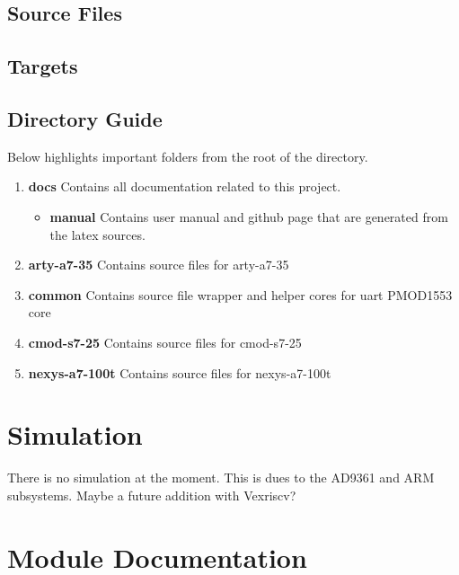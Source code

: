 \subsection{Source Files}



\subsection{Targets} \label{targets}



\subsection{Directory Guide}

\par
Below highlights important folders from the root of the directory.

\begin{enumerate}
  \item \textbf{docs} Contains all documentation related to this project.
    \begin{itemize}
      \item \textbf{manual} Contains user manual and github page that are generated from the latex sources.
    \end{itemize}
  \item \textbf{arty-a7-35} Contains source files for arty-a7-35
  \item \textbf{common} Contains source file wrapper and helper cores for uart PMOD1553 core
  \item \textbf{cmod-s7-25} Contains source files for cmod-s7-25
  \item \textbf{nexys-a7-100t} Contains source files for nexys-a7-100t
\end{enumerate}

\newpage

\section{Simulation}
\par
There is no simulation at the moment. This is dues to the AD9361 and ARM subsystems. Maybe a future addition with Vexriscv?

\newpage

\section{Module Documentation} \label{Module Documentation}

